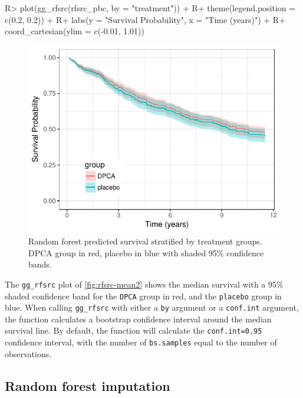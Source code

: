 \documentclass[article, nojss]{jss}
\begin{document}
\begin{Schunk}
\begin{Sinput}
R> plot(gg_rfsrc(rfsrc_pbc, by = "treatment")) +
R+   theme(legend.position = c(0.2, 0.2)) +
R+   labs(y = "Survival Probability", x = "Time (years)") +
R+   coord_cartesian(ylim = c(-0.01, 1.01))
\end{Sinput}
\begin{figure}[!htb]

{\centering \includegraphics{rfs-rfsrc-mean2-1}

}

\caption[Random forest predicted survival stratified by treatment groups]{Random forest predicted survival stratified by treatment groups. DPCA group in red, placebo in blue with shaded 95\% confidence bands.}\label{fig:rfsrc-mean2}
\end{figure}
\end{Schunk}

The \texttt{gg\_rfsrc} plot of \autoref{fig:rfsrc-mean2} shows the
median survival with a \(95\%\) shaded confidence band for the
\texttt{DPCA} group in red, and the \texttt{placebo} group in blue. When
calling \texttt{gg\_rfsrc} with either a \texttt{by} argument or a
\texttt{conf.int} argument, the function calculates a bootstrap
confidence interval around the median survival line. By default, the
function will calculate the \texttt{conf.int=0.95} confidence interval,
with the number of \texttt{bs.samples} equal to the number of
observations.

\subsection{Random forest imputation}\label{random-forest-imputation}
\end{document}

